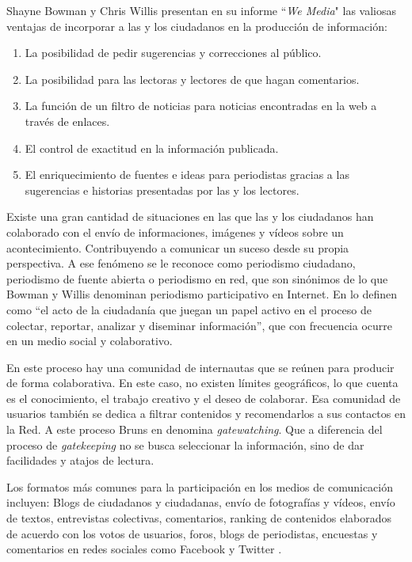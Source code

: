 Shayne Bowman y Chris Willis presentan en su informe ``\emph{We Media}" \cite{wethemedia} las valiosas ventajas de incorporar a las y los ciudadanos en la producción de información:
\begin{enumerate}
\item La posibilidad de pedir sugerencias y correcciones al público.
\item La posibilidad para las lectoras y lectores de que hagan comentarios.
\item La función de un filtro de noticias para noticias encontradas en la web a través de enlaces.
\item El control de exactitud en la información publicada.
\item El enriquecimiento de fuentes e ideas para periodistas gracias a las sugerencias e historias presentadas por las y los lectores.
\end{enumerate}

Existe una gran cantidad de situaciones en las que las y los ciudadanos han colaborado con el envío de informaciones, imágenes y vídeos sobre un acontecimiento. Contribuyendo a comunicar un suceso desde su propia perspectiva. 
A ese fenómeno se le reconoce como periodismo ciudadano, periodismo de fuente abierta o periodismo en red, que son sinónimos de lo que Bowman y Willis denominan periodismo participativo en Internet. En \cite{wethemedia} lo definen como “el acto de la ciudadanía que juegan un papel activo en el proceso de colectar, reportar, analizar y diseminar información”, que con frecuencia ocurre en un medio social y colaborativo. %

En este proceso hay una comunidad de internautas que se reúnen para producir de forma colaborativa. En este caso, no existen límites geográficos, lo que cuenta es el conocimiento, el trabajo creativo y el deseo de colaborar. Esa comunidad de usuarios también se dedica a filtrar contenidos y recomendarlos a sus contactos en la Red. A este proceso Bruns en \cite{quteprints189} denomina \emph{gatewatching}. Que a diferencia del proceso de \emph{gatekeeping} no se busca seleccionar la información, sino de dar facilidades y atajos de lectura.

Los formatos más comunes para la participación en los medios de comunicación incluyen: Blogs de ciudadanos y ciudadanas, envío de fotografías y vídeos, envío de textos, entrevistas colectivas, comentarios, ranking de contenidos elaborados de acuerdo con los votos de usuarios, foros, blogs de periodistas, encuestas y comentarios en redes sociales como Facebook y Twitter \cite{doi17512781003640703}. %

